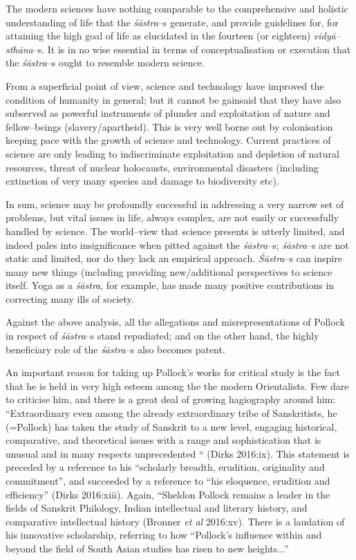 The modern sciences have nothing comparable to the comprehensive and holistic understanding of life that the \textit{śāstra}–s generate, and provide guidelines for, for attaining the high goal of life as elucidated in the fourteen (or eighteen) \textit{vidyā–sthāna}–s. It is in no wise essential in terms of conceptualisation or execution that the \textit{śāstra}–s ought to resemble modern science.

From a superficial point of view, science and technology have improved the condition of humanity in general; but it cannot be gainsaid that they have also subserved as powerful instruments of plunder and exploitation of nature and fellow–beings (slavery/apartheid). This is very well borne out by colonisation keeping pace with the growth of science and technology. Current practices of science are only leading to indiscriminate exploitation and depletion of natural resources, threat of nuclear holocausts, environmental disasters (including extinction of very many species and damage to biodiversity etc).

In sum, science may be profoundly successful in addressing a very narrow set of problems, but vital issues in life, always complex, are not easily or successfully handled by science. The world–view that science presents is utterly limited, and indeed pales into insignificance when pitted against the \textit{śāstra}–s; \textit{śāstra}–s are not static and limited, nor do they lack an empirical approach. \textit{Śāstra}–s can inspire many new things (including providing new/additional perspectives to science itself. Yoga as a \textit{śāstra}, for example, has made many positive contributions in correcting many ills of society.

Against the above analysis, all the allegations and misrepresentations of Pollock in respect of \textit{śāstra}–s stand repudiated; and on the other hand, the highly beneficiary role of the \textit{śāstra}–s also becomes patent.

\delimiter

\begin{myquote}
An important reason for taking up Pollock’s works for critical study is the fact that he is held in very high esteem among the the modern Orientalists. Few dare to criticise him, and there is a great deal of growing hagiography around him: “Extraordinary even among the already extraordinary tribe of Sanskritists, he (=Pollock) has taken the study of Sanskrit to a new level, engaging historical, comparative, and theoretical issues with a range and sophistication that is unusual and in many respects unprecedented “ (Dirks 2016:ix). This statement is preceded by a reference to his “scholarly breadth, erudition, originality and commitment”, and succeeded by a reference to “his eloquence, erudition and efficiency” (Dirks 2016:xiii). Again, “Sheldon Pollock remains a leader in the fields of Sanskrit Philology, Indian intellectual and literary history, and comparative intellectual history (Bronner \textit{et al} 2016:xv). There is a laudation of his innovative scholarship, referring to how “Pollock’s influence within and beyond the field of South Asian studies has risen to new heights...”
\end{myquote}


